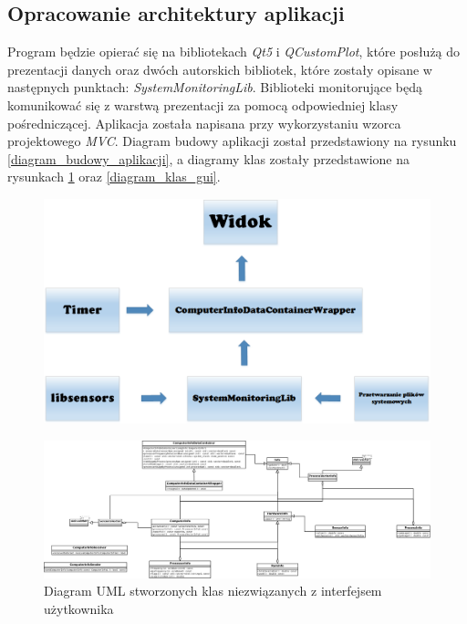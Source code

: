 \documentclass[a4paper]{article}
\begin{document}
\subsection{Opracowanie architektury aplikacji}
Program będzie opierać się na bibliotekach \textit{Qt5} i \textit{QCustomPlot}, które posłużą do prezentacji danych oraz dwóch autorskich bibliotek, które zostały opisane w następnych punktach: \textit{SystemMonitoringLib}. Biblioteki monitorujące będą komunikować się z warstwą prezentacji za pomocą odpowiedniej klasy pośredniczącej. Aplikacja została napisana przy wykorzystaniu wzorca projektowego \textit{MVC}. Diagram budowy aplikacji został przedstawiony na rysunku \ref{diagram_budowy_aplikacji}, a diagramy klas zostały przedstawione na rysunkach \ref{diagram_klas_system_monitoring} oraz \ref{diagram_klas_gui}.

\begin{figure}[h]
	\centering
	\includegraphics[width=\linewidth]{img/diagramBudowyAplikacji.png}
\end{figure}


\begin{figure}[h]
	\centering
	\includegraphics[width=0.75\paperheight, angle=90]{img/diagramKlas.png}
	\caption{Diagram UML stworzonych klas niezwiązanych z interfejsem użytkownika}
	\label{diagram_klas_system_monitoring}
\end{figure}
\end{document}
